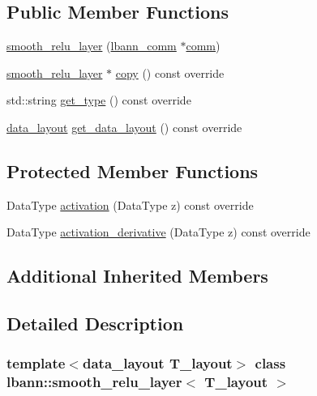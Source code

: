 \subsection*{Public Member Functions}
\begin{DoxyCompactItemize}
\item 
\hyperlink{classlbann_1_1smooth__relu__layer_aa045764ef0113d8516ddf95a3b810ce0}{smooth\+\_\+relu\+\_\+layer} (\hyperlink{classlbann_1_1lbann__comm}{lbann\+\_\+comm} $\ast$\hyperlink{file__io_8cpp_ab048c6f9fcbcfaa57ce68b00263dbebe}{comm})
\item 
\hyperlink{classlbann_1_1smooth__relu__layer}{smooth\+\_\+relu\+\_\+layer} $\ast$ \hyperlink{classlbann_1_1smooth__relu__layer_af6fb922556c2debf7bec8d6f376dbe94}{copy} () const override
\item 
std\+::string \hyperlink{classlbann_1_1smooth__relu__layer_a33833fe4b2693b8d25b286d9af7444e5}{get\+\_\+type} () const override
\item 
\hyperlink{base_8hpp_a786677cbfb3f5677b4d84f3056eb08db}{data\+\_\+layout} \hyperlink{classlbann_1_1smooth__relu__layer_a2514d7b711e0a6cbf494c5bd9a959d03}{get\+\_\+data\+\_\+layout} () const override
\end{DoxyCompactItemize}
\subsection*{Protected Member Functions}
\begin{DoxyCompactItemize}
\item 
Data\+Type \hyperlink{classlbann_1_1smooth__relu__layer_a7fa882bb89a244a5a4ccb6614815f1c6}{activation} (Data\+Type z) const override
\item 
Data\+Type \hyperlink{classlbann_1_1smooth__relu__layer_a44b4b163830213b9fb270e9ef2cc70ae}{activation\+\_\+derivative} (Data\+Type z) const override
\end{DoxyCompactItemize}
\subsection*{Additional Inherited Members}


\subsection{Detailed Description}
\subsubsection*{template$<$data\+\_\+layout T\+\_\+layout$>$\newline
class lbann\+::smooth\+\_\+relu\+\_\+layer$<$ T\+\_\+layout $>$}

